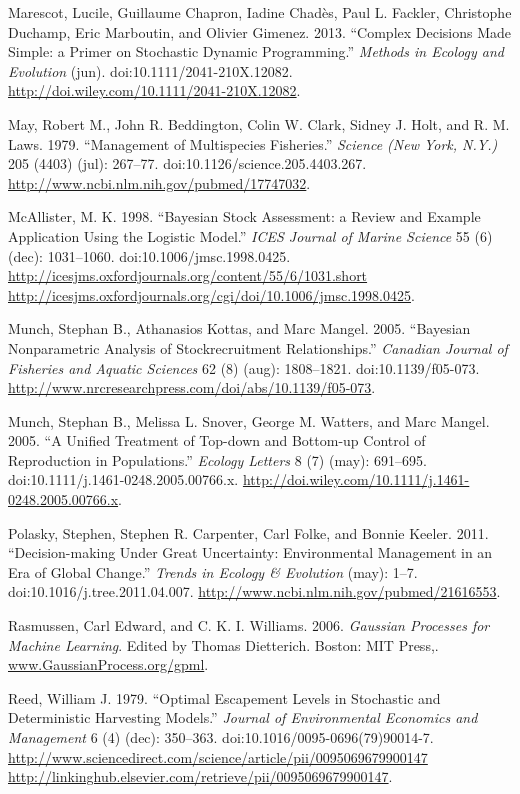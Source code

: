 \documentclass[author-year, review]{elsarticle} %
\begin{document}
Marescot, Lucile, Guillaume Chapron, Iadine Chadès, Paul L. Fackler,
Christophe Duchamp, Eric Marboutin, and Olivier Gimenez. 2013. ``Complex
Decisions Made Simple: a Primer on Stochastic Dynamic Programming.''
\emph{Methods in Ecology and Evolution} (jun).
doi:10.1111/2041-210X.12082.
\url{http://doi.wiley.com/10.1111/2041-210X.12082}.

May, Robert M., John R. Beddington, Colin W. Clark, Sidney J. Holt, and
R. M. Laws. 1979. ``Management of Multispecies Fisheries.''
\emph{Science (New York, N.Y.)} 205 (4403) (jul): 267--77.
doi:10.1126/science.205.4403.267.
\url{http://www.ncbi.nlm.nih.gov/pubmed/17747032}.

McAllister, M. K. 1998. ``Bayesian Stock Assessment: a Review and
Example Application Using the Logistic Model.'' \emph{ICES Journal of
Marine Science} 55 (6) (dec): 1031--1060. doi:10.1006/jmsc.1998.0425.
\href{http://icesjms.oxfordjournals.org/content/55/6/1031.short http://icesjms.oxfordjournals.org/cgi/doi/10.1006/jmsc.1998.0425}{http://icesjms.oxfordjournals.org/content/55/6/1031.short
http://icesjms.oxfordjournals.org/cgi/doi/10.1006/jmsc.1998.0425}.

Munch, Stephan B., Athanasios Kottas, and Marc Mangel. 2005. ``Bayesian
Nonparametric Analysis of Stockrecruitment Relationships.''
\emph{Canadian Journal of Fisheries and Aquatic Sciences} 62 (8) (aug):
1808--1821. doi:10.1139/f05-073.
\url{http://www.nrcresearchpress.com/doi/abs/10.1139/f05-073}.

Munch, Stephan B., Melissa L. Snover, George M. Watters, and Marc
Mangel. 2005. ``A Unified Treatment of Top-down and Bottom-up Control of
Reproduction in Populations.'' \emph{Ecology Letters} 8 (7) (may):
691--695. doi:10.1111/j.1461-0248.2005.00766.x.
\url{http://doi.wiley.com/10.1111/j.1461-0248.2005.00766.x}.

Polasky, Stephen, Stephen R. Carpenter, Carl Folke, and Bonnie Keeler.
2011. ``Decision-making Under Great Uncertainty: Environmental
Management in an Era of Global Change.'' \emph{Trends in Ecology \&
Evolution} (may): 1--7. doi:10.1016/j.tree.2011.04.007.
\url{http://www.ncbi.nlm.nih.gov/pubmed/21616553}.

Rasmussen, Carl Edward, and C. K. I. Williams. 2006. \emph{Gaussian
Processes for Machine Learning}. Edited by Thomas Dietterich. Boston:
MIT Press,. \url{www.GaussianProcess.org/gpml}.

Reed, William J. 1979. ``Optimal Escapement Levels in Stochastic and
Deterministic Harvesting Models.'' \emph{Journal of Environmental
Economics and Management} 6 (4) (dec): 350--363.
doi:10.1016/0095-0696(79)90014-7.
\href{http://www.sciencedirect.com/science/article/pii/0095069679900147 http://linkinghub.elsevier.com/retrieve/pii/0095069679900147}{http://www.sciencedirect.com/science/article/pii/0095069679900147
http://linkinghub.elsevier.com/retrieve/pii/0095069679900147}.
\end{document}
